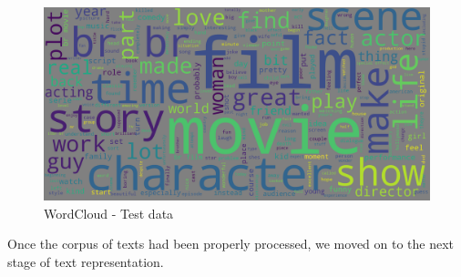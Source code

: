 \documentclass[fleqn,10pt]{SelfArx} %
\begin{document}
\begin{figure}[H]
\begin{center}
  \includegraphics[scale=0.1]{./images/WordCloud_test.png}
\end{center}
  \caption{WordCloud - Test data}
\end{figure}

Once the corpus of texts had been properly processed, we moved on to the next stage of text representation.
\end{document}
